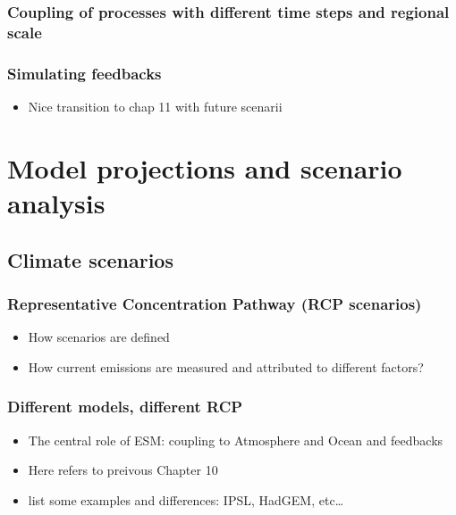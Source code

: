 \documentclass[12pt,oneside]{book}
\providecommand{\tightlist}{%
  \setlength{\itemsep}{0pt}\setlength{\parskip}{0pt}}
\begin{document}
\subsection{Coupling of processes with different time steps and regional
scale}\label{coupling-of-processes-with-different-time-steps-and-regional-scale}

\subsection{Simulating feedbacks}\label{simulating-feedbacks}

\begin{itemize}
\tightlist
\item
  Nice transition to chap 11 with future scenarii
\end{itemize}

\chapter{Model projections and scenario
analysis}\label{model-projections-and-scenario-analysis}


\section{Climate scenarios}\label{climate-scenarios}

\subsection{Representative Concentration Pathway (RCP
scenarios)}\label{representative-concentration-pathway-rcp-scenarios}

\begin{itemize}
\tightlist
\item
  How scenarios are defined
\item
  How current emissions are measured and attributed to different
  factors?
\end{itemize}

\subsection{Different models, different
RCP}\label{different-models-different-rcp}

\begin{itemize}
\tightlist
\item
  The central role of ESM: coupling to Atmosphere and Ocean and
  feedbacks
\item
  Here refers to preivous Chapter 10
\item
  list some examples and differences: IPSL, HadGEM, etc\ldots{}
\end{itemize}
\end{document}
